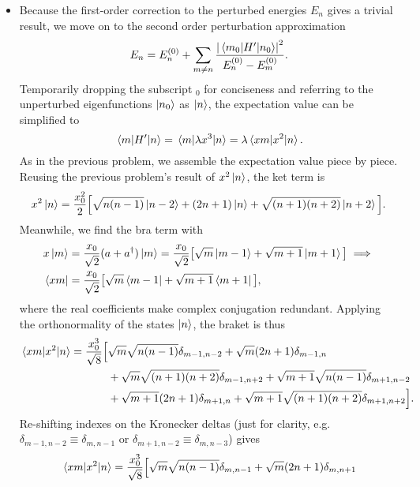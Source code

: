 \documentclass[11pt, a4paper]{article}
\newcommand{\pert}{perturbation\xspace}
\begin{document}
\begin{itemize}
	\item Because the first-order correction to the perturbed energies $ E_{n} $ gives a trivial result, we move on to the second order \pert approximation
	\begin{equation*}
		E_{n} = E^{(0)}_{n} + \sum_{m \neq n} \frac{\abs{\mel{m_{0}}{H'}{n_{0}}}^{2}}{E^{(0)}_{n} - E^{(0)}_{m}}.
	\end{equation*}
	Temporarily dropping the subscript $ _{0} $ for conciseness and referring to the unperturbed eigenfunctions $ \ket{n_{0}} $ as $ \ket{n} $, the expectation value can be simplified to
	\begin{equation*}
		\mel{m}{H'}{n} = \mel{m}{\lambda x^{3}}{n} = \lambda \mel{xm}{x^{2}}{n}.
	\end{equation*}
	As in the previous problem, we assemble the expectation value piece by piece. Reusing the previous problem's result of $ x^{2}\ket{n} $, the ket term is
	\begin{equation*}
		x^{2}\ket{n} = \frac{x_{0}^{2}}{2}\Big[\sqrt{n(n-1)}\ket{n-2}+(2n+1)\ket{n}+\sqrt{(n+1)(n+2)}\ket{n+2}\Big].
	\end{equation*}
	Meanwhile, we find the bra term with 
	\begin{align*}
		&x \ket{m} = \frac{x_{0}}{\sqrt{2}}(a + a^{\dagger})\ket{m} = \frac{x_{0}}{\sqrt{2}}\big[\sqrt{m}\ket{m-1} + \sqrt{m+1}\ket{m+1}\big] \implies \\
		&\bra{xm} = \frac{x_{0}}{\sqrt{2}}\big[\sqrt{m}\bra{m-1} + \sqrt{m+1}\bra{m+1}\big],
	\end{align*}
	where the real coefficients make complex conjugation redundant. Applying the orthonormality of the states $ \ket{n} $, the braket is thus
	\begin{align*}
		\mel{xm}{x^{2}}{n} = \frac{x_{0}^{3}}{\sqrt{8}}\Big[&\sqrt{m}\sqrt{n(n-1)} \delta_{m-1,n-2} + \sqrt{m}(2n+1)\delta_{m-1,n}\\
		& + \sqrt{m}\sqrt{(n+1)(n+2)}\delta_{m-1,n+2} + \sqrt{m+1}\sqrt{n(n-1)}\delta_{m+1,n-2}\\
		& + \sqrt{m+1}(2n+1)\delta_{m+1,n} + \sqrt{m+1}\sqrt{(n+1)(n+2)}\delta_{m+1,n+2} \Big].
	\end{align*}
	Re-shifting indexes on the Kronecker deltas (just for clarity, e.g. $ \delta_{m-1,n-2} \equiv \delta_{m, n-1} $ or $ \delta_{m+1, n-2} \equiv \delta_{m, n-3} $) gives
	\begin{align*}
		\mel{xm}{x^{2}}{n} = \frac{x_{0}^{3}}{\sqrt{8}}\Big[&\sqrt{m}\sqrt{n(n-1)} \delta_{m,n-1} + \sqrt{m}(2n+1)\delta_{m,n+1}\\

\end{align*}
\end{itemize}
\end{document}
